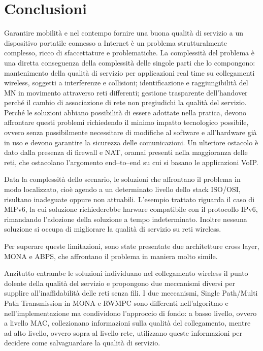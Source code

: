 \documentclass[12pt,a4paper,openright,twoside]{book}
\begin{document}
\clearpage{\pagestyle{empty}\cleardoublepage}


\chapter{Conclusioni}

Garantire mobilità e nel contempo fornire una buona qualità di
servizio a un dispositivo portatile connesso a Internet è un problema
strutturalmente complesso, ricco di sfaccettature e problematiche. La
complessità del problema è una diretta conseguenza della complessità
delle singole parti che lo compongono: mantenimento della qualità di
servizio per applicazioni real time su collegamenti wireless, soggetti
a interferenze e collisioni; identificazione e raggiungibilità del MN
in movimento attraverso reti differenti; gestione trasparente
dell'handover perché il cambio di associazione di rete non pregiudichi
la qualità del servizio. Perché le soluzioni abbiano possibilità di
essere adottate nella pratica, devono affrontare questi problemi
richiedendo il minimo impatto tecnologico possibile, ovvero senza
possibilmente necessitare di modifiche al software e all'hardware già
in uso e devono garantire la sicurezza delle comunicazioni. Un
ulteriore ostacolo è dato dalla presenza di firewall e NAT, oramai
presenti nella maggioranza delle reti, che ostacolano l'argomento
end--to--end su cui si basano le applicazioni VoIP.

Data la complessità dello scenario, le soluzioni che affrontano il
problema in modo localizzato, cioè agendo a un determinato livello
dello stack ISO/OSI, risultano inadeguate oppure non
attuabili. L'esempio trattato riguarda il caso di MIPv6, la cui
soluzione richiederebbe harware compatibile con il protocollo IPv6,
rimandando l'adozione della soluzione a tempo indeterminato. Inoltre
nessuna soluzione si occupa di migliorare la qualità di servizio su
reti wireless.

Per superare queste limitazioni, sono state presentate due
architetture cross layer, MONA e ABPS, che affrontano il problema in
maniera molto simile.

Anzitutto entrambe le soluzioni individuano nel collegamento wireless
il punto dolente della qualità del servizio e propongono due
meccanismi diversi per supplire all'inaffidabilità delle reti senza
fili. I due meccanismi, Single Path/Multi Path Transmission in MONA e
RWMPC sono differenti nell'algoritmo e nell'implementazione ma
condividono l'approccio di fondo: a basso livello, ovvero a livello
MAC, collezionano informazioni sulla qualità del collegamento, mentre
ad alto livello, ovvero sopra al livello rete, utilizzano queste
informazioni per decidere come salvaguardare la qualità di servizio.
\end{document}
